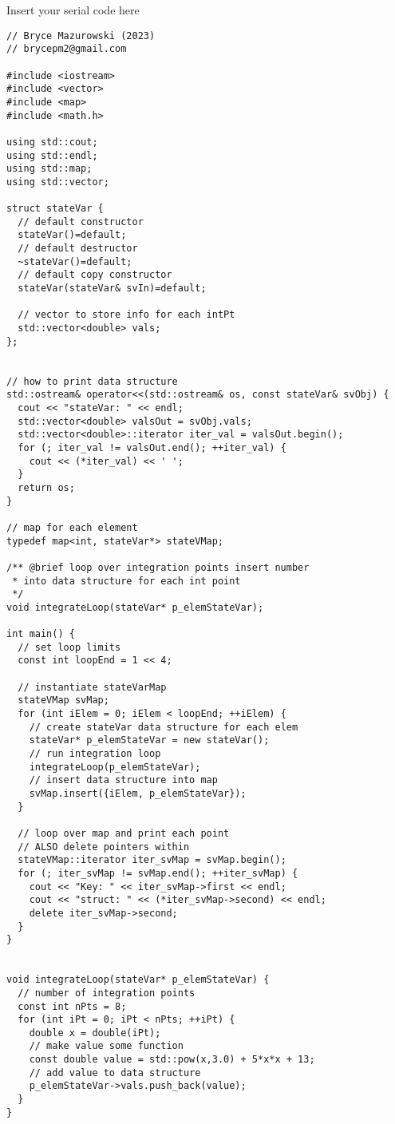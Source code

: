 \documentclass[11pt]{article}
\begin{document}
Insert your serial code here
\begin{verbatim}
// Bryce Mazurowski (2023)
// brycepm2@gmail.com

#include <iostream>
#include <vector>
#include <map>
#include <math.h>

using std::cout;
using std::endl;
using std::map;
using std::vector;

struct stateVar {
  // default constructor
  stateVar()=default;
  // default destructor
  ~stateVar()=default;
  // default copy constructor
  stateVar(stateVar& svIn)=default;

  // vector to store info for each intPt
  std::vector<double> vals;
};


// how to print data structure
std::ostream& operator<<(std::ostream& os, const stateVar& svObj) {
  cout << "stateVar: " << endl;
  std::vector<double> valsOut = svObj.vals;
  std::vector<double>::iterator iter_val = valsOut.begin();
  for (; iter_val != valsOut.end(); ++iter_val) {
    cout << (*iter_val) << ' ';
  }
  return os;
}

// map for each element
typedef map<int, stateVar*> stateVMap;

/** @brief loop over integration points insert number
 * into data structure for each int point
 */
void integrateLoop(stateVar* p_elemStateVar);

int main() {
  // set loop limits
  const int loopEnd = 1 << 4;

  // instantiate stateVarMap
  stateVMap svMap;
  for (int iElem = 0; iElem < loopEnd; ++iElem) {
    // create stateVar data structure for each elem
    stateVar* p_elemStateVar = new stateVar();
    // run integration loop
    integrateLoop(p_elemStateVar);
    // insert data structure into map
    svMap.insert({iElem, p_elemStateVar});
  }

  // loop over map and print each point
  // ALSO delete pointers within
  stateVMap::iterator iter_svMap = svMap.begin();
  for (; iter_svMap != svMap.end(); ++iter_svMap) {
    cout << "Key: " << iter_svMap->first << endl;
    cout << "struct: " << (*iter_svMap->second) << endl;
    delete iter_svMap->second;
  }
}


void integrateLoop(stateVar* p_elemStateVar) {
  // number of integration points
  const int nPts = 8;
  for (int iPt = 0; iPt < nPts; ++iPt) {
    double x = double(iPt);
    // make value some function
    const double value = std::pow(x,3.0) + 5*x*x + 13;
    // add value to data structure
    p_elemStateVar->vals.push_back(value);
  }
} 
\end{verbatim}
\end{document}
